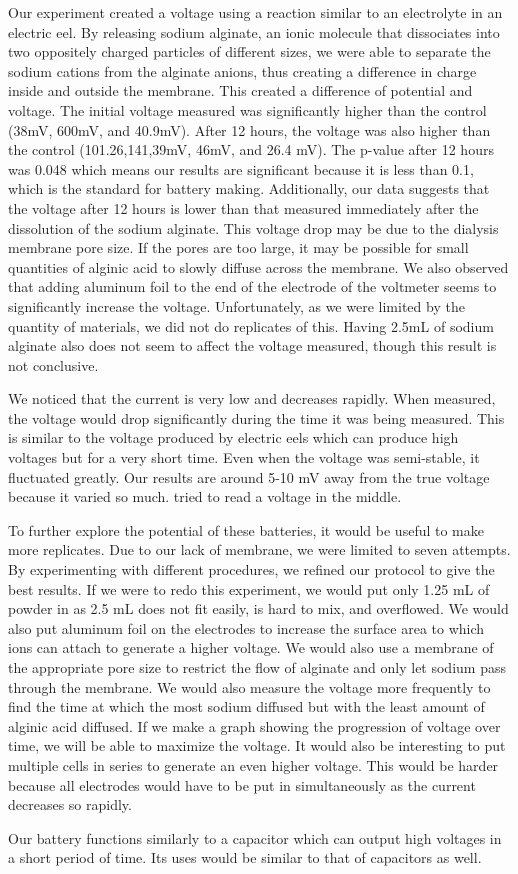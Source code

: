 \documentclass[letterpaper]{article}
\begin{document}
Our experiment created a voltage using a reaction similar to an electrolyte in an 
electric eel. By releasing sodium alginate, an ionic molecule that dissociates into 
two oppositely charged particles of different sizes, we were able to separate the 
sodium cations from the alginate anions, thus creating a difference in charge inside 
and outside the membrane. This created a difference of potential and voltage. The initial 
voltage measured was significantly higher than the control (38mV, 600mV, and 40.9mV). 
After 12 hours, the voltage was also higher than the control (101.26,141,39mV, 46mV, and 26.4 mV). 
The p-value after 12 hours was 0.048 which means our results are significant because 
it is less than 0.1, which is the standard for battery making\parencite{niriQuantifyingKeyFactors2022}. 
Additionally, our data suggests that the voltage after 12 hours is lower than that measured immediately after the dissolution of the sodium alginate. This voltage drop may be due to the dialysis membrane pore size. If the pores are too large, it may be possible for small quantities of alginic acid to slowly diffuse across the membrane. We also observed that adding aluminum foil to the end of the electrode of the voltmeter seems to significantly increase the voltage. Unfortunately, as we were limited by the quantity of materials, we did not do replicates of this. Having 2.5mL of sodium alginate also does not seem to affect the voltage measured, though this result is not conclusive.

We noticed that the current is very low and decreases rapidly. When measured, 
the voltage would drop significantly during the time it was being measured. This is 
similar to the voltage produced by electric eels which can produce high voltages but 
for a very short time. Even when the voltage was semi-stable, it fluctuated greatly. 
Our results are around 5-10 mV away from the true voltage because it varied so much. 
 tried to read a voltage in the middle. 

To further explore the potential of these batteries, it would be useful to make more 
replicates. Due to our lack of membrane, we were limited to seven attempts. By experimenting 
with different procedures, we refined our protocol to give the best results. If we were to 
redo this experiment, we would put only 1.25 mL of powder in as 2.5 mL does not fit easily, 
is hard to mix, and overflowed. We would also put aluminum foil on the electrodes to increase 
the surface area to which ions can attach to generate a higher voltage. We would also use a 
membrane of the appropriate pore size to restrict the flow of alginate and only let sodium pass 
through the membrane. We would also measure the voltage more frequently to find the time at which 
the most sodium diffused but with the least amount of alginic acid diffused. If we make a graph 
showing the progression of voltage over time, we will be able to maximize the voltage. It would 
also be interesting to put multiple cells in series to generate an even higher voltage. This would 
be harder because all electrodes would have to be put in simultaneously as the current decreases 
so rapidly. 

Our battery functions similarly to a capacitor which can output high voltages 
in a short period of time. Its uses would be similar to that of capacitors as well.


\printbibliography[heading=bibintoc]
\end{document}
